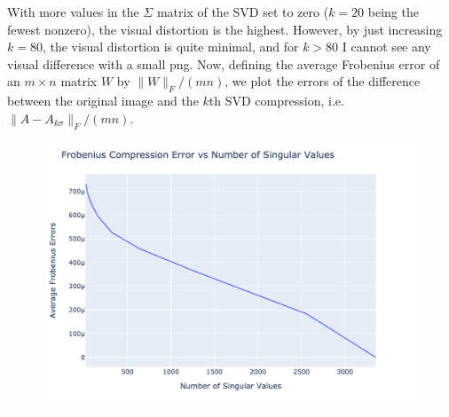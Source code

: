 \documentclass{article}
\begin{document}
\vspace*{-20pt}
\begin{figure}[ht]
   \hfill 	
   \hfill	
\end{figure}

With more values in the $\Sigma$ matrix of the SVD set to zero ($k=20$ being the fewest nonzero), the visual distortion is the highest. However, by just increasing $k=80$, the visual distortion is quite minimal, and for $k > 80$ I cannot see any visual difference with a small png. Now, defining the average Frobenius error of an $m \times n$ matrix $W$ by $\|W\|_F / (mn)$, we plot the errors of the difference between the original image and the $k$th SVD compression, i.e. $\|A-A_{k\sigma}\|_F/(mn)$.

\begin{figure}[H]
    \centering
    \includegraphics[scale=0.2]{images/errors.png}
\end{figure}
\end{document}
